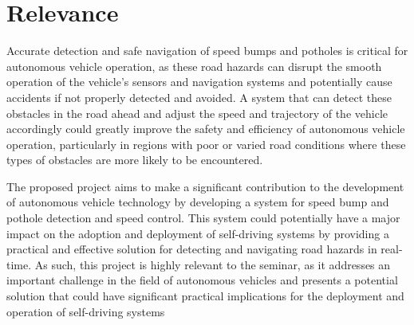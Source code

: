\section{Relevance}
Accurate detection and safe navigation of speed bumps and potholes is critical for autonomous vehicle operation, as these road hazards can disrupt the smooth operation of the vehicle's sensors and navigation systems and potentially cause accidents if not properly detected and avoided. A system that can detect these obstacles in the road ahead and adjust the speed and trajectory of the vehicle accordingly could greatly improve the safety and efficiency of autonomous vehicle operation, particularly in regions with poor or varied road conditions where these types of obstacles are more likely to be encountered.

\noindent
The proposed project aims to make a significant contribution to the development of autonomous vehicle technology by developing a system for speed bump and pothole detection and speed control. This system could potentially have a major impact on the adoption and deployment of self-driving systems by providing a practical and effective solution for detecting and navigating road hazards in real-time. As such, this project is highly relevant to the seminar, as it addresses an important challenge in the field of autonomous vehicles and presents a potential solution that could have significant practical implications for the deployment and operation of self-driving systems